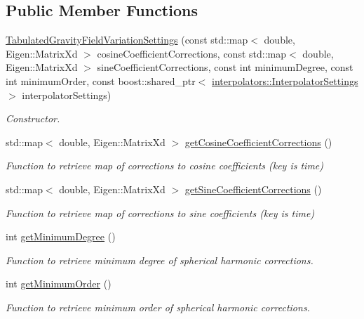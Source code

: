 \subsection*{Public Member Functions}
\begin{DoxyCompactItemize}
\item 
\hyperlink{classtudat_1_1simulation__setup_1_1TabulatedGravityFieldVariationSettings_a05f932b479b3b7bdb54c56126bb265bb}{Tabulated\+Gravity\+Field\+Variation\+Settings} (const std\+::map$<$ double, Eigen\+::\+Matrix\+Xd $>$ cosine\+Coefficient\+Corrections, const std\+::map$<$ double, Eigen\+::\+Matrix\+Xd $>$ sine\+Coefficient\+Corrections, const int minimum\+Degree, const int minimum\+Order, const boost\+::shared\+\_\+ptr$<$ \hyperlink{classtudat_1_1interpolators_1_1InterpolatorSettings}{interpolators\+::\+Interpolator\+Settings} $>$ interpolator\+Settings)
\begin{DoxyCompactList}\small\item\em Constructor. \end{DoxyCompactList}\item 
std\+::map$<$ double, Eigen\+::\+Matrix\+Xd $>$ \hyperlink{classtudat_1_1simulation__setup_1_1TabulatedGravityFieldVariationSettings_ac0454bcd7b8cb432ac761d3b523845b9}{get\+Cosine\+Coefficient\+Corrections} ()
\begin{DoxyCompactList}\small\item\em Function to retrieve map of corrections to cosine coefficients (key is time) \end{DoxyCompactList}\item 
std\+::map$<$ double, Eigen\+::\+Matrix\+Xd $>$ \hyperlink{classtudat_1_1simulation__setup_1_1TabulatedGravityFieldVariationSettings_a669f75555dcd08cbe24de70886c95a86}{get\+Sine\+Coefficient\+Corrections} ()
\begin{DoxyCompactList}\small\item\em Function to retrieve map of corrections to sine coefficients (key is time) \end{DoxyCompactList}\item 
int \hyperlink{classtudat_1_1simulation__setup_1_1TabulatedGravityFieldVariationSettings_af58d7f7ce64bd85472c35a98cbd17050}{get\+Minimum\+Degree} ()
\begin{DoxyCompactList}\small\item\em Function to retrieve minimum degree of spherical harmonic corrections. \end{DoxyCompactList}\item 
int \hyperlink{classtudat_1_1simulation__setup_1_1TabulatedGravityFieldVariationSettings_a4ca5cea880b704f7e2673d65df2ca17e}{get\+Minimum\+Order} ()
\begin{DoxyCompactList}\small\item\em Function to retrieve minimum order of spherical harmonic corrections. \end{DoxyCompactList}\end{DoxyCompactItemize}
